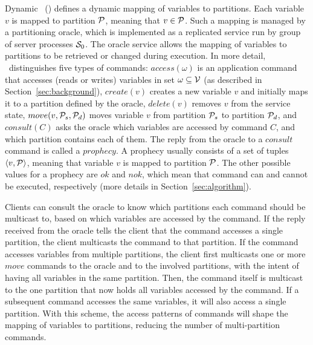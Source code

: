Dynamic \ssmr\ (\dssmr) defines a dynamic mapping of variables to partitions.
Each variable $v$ is mapped to partition $\mathcal{P}$, meaning that $v \in \mathcal{P}$.
Such a mapping is managed by a partitioning oracle, which is implemented as a replicated service run by group of server processes $\mathcal{S}_0$.
The oracle service allows the mapping of variables to partitions to be retrieved or changed during execution.
In more detail, \dssmr\ distinguishes five types of commands:
$access(\omega)$ is an application command that accesses (reads or writes) variables in set $\omega \subseteq \mathcal{V}$ (as described in Section~\ref{sec:background}),
$create(v)$ creates a new variable $v$ and initially maps it to a partition defined by the oracle,
$delete(v)$ removes $v$ from the service state,
$move(v,\mathcal{P}_s,\mathcal{P}_d)$ moves variable $v$ from partition $\mathcal{P}_s$ to partition $\mathcal{P}_d$,
and $consult(C)$ asks the oracle which variables are accessed by command $C$, and which partition contains each of them.
The reply from the oracle to a $consult$ command is called a $prophecy$.
A prophecy usually consists of a set of tuples $\langle v, \mathcal{P} \rangle$, meaning that variable $v$ is mapped to partition $\mathcal{P}$.
The other possible values for a prophecy are $ok$ and $nok$, which mean that command can and cannot be executed, respectively (more details in Section~\ref{sec:algorithm}).


Clients can consult the oracle to know which partitions each command should be multicast to, based on which variables are accessed by the command.
If the reply received from the oracle tells the client that the command accesses a single partition, the client multicasts the command to that partition.
If the command accesses variables from multiple partitions, the client first multicasts one or more $move$ commands to the oracle and to the involved partitions, with the intent of having all variables in the same partition.
Then, the command itself is multicast to the one partition that now holds all variables accessed by the command.
If a subsequent command accesses the same variables, it will also access a single partition.
With this scheme, the access patterns of commands will shape the mapping of variables to partitions, reducing the number of multi-partition commands.

